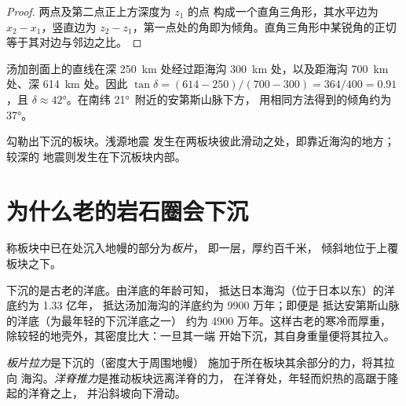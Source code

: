 \begin{proof}
两点及第二点正上方深度为 $z_1$ 的点
构成一个直角三角形，其水平边为 $x_2 - x_1$，竖直边为
$z_2 - z_1$，第一点处的角即为倾角。直角三角形中某锐角的正切
等于其对边与邻边之比。
\end{proof}

\begin{example}[汤加下方的倾角]\label{ex:g11:subduction-zones:dip}
汤加剖面上的直线在深 \qty{250}{km} 处经过距海沟
\qty{300}{km} 处，以及距海沟 \qty{700}{km} 处、深 \qty{614}{km} 处。因此
$\tan\delta = (614 - 250)/(700 - 300) = 364/400 = 0.91$，且
$\delta \approx \ang{42}$。在南纬 \ang{21}~附近的安第斯山脉下方，
用相同方法得到的倾角约为 \ang{37}。
\end{example}

勾勒出下沉的板块。浅源地震
发生在两板块彼此滑动之处，即靠近海沟的地方；较深的
地震则发生在下沉板块内部。

\section{为什么老的岩石圈会下沉}

\begin{definition}[板片]\label{def:g11:subduction-zones:slab}
称板块中已在处沉入地幔的部分为\emph{板片}，
即一层，厚约百千米，
倾斜地位于上覆板块之下。
\end{definition}

下沉的是古老的洋底。由洋底的年龄可知，
抵达日本海沟（位于日本以东）的洋底约为 1.33 亿年，
抵达汤加海沟的洋底约为 9900 万年；即便是
抵达安第斯山脉的洋底（为最年轻的下沉洋底之一）
约为 4900 万年。这样古老的寒冷而厚重，
除较轻的地壳外，其密度比大：一旦其一端
开始下沉，其自身重量便将其拉入。

\begin{definition}\label{def:g11:subduction-zones:slab-pull}
\emph{板片拉力}是下沉的（密度大于周围地幔）
施加于所在板块其余部分的力，将其拉向
海沟。\emph{洋脊推力}是推动板块远离洋脊的力，
在洋脊处，年轻而炽热的高踞于隆起的洋脊之上，
并沿斜坡向下滑动。
\end{definition}

